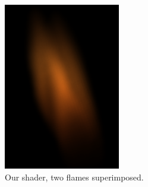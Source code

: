 \begin{figure}[htpb]
        \centering
        \begin{subfigure}[t]{0.2\textwidth}
                \includegraphics[width=\textwidth]{img/result_synthetic}
                \caption{Our shader, two flames superimposed.}
                \label{fig:result_synthetic}
        \end{subfigure}%
        \qquad %
        \begin{subfigure}[t]{0.15\textwidth}

\end{subfigure}
\end{figure}
